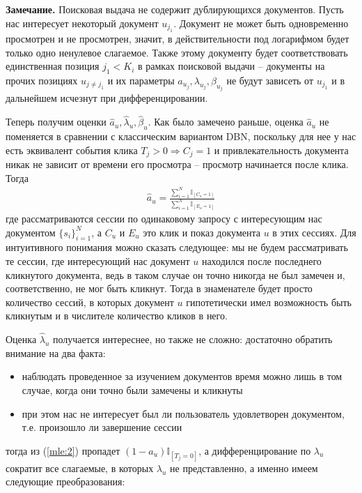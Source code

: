 \documentclass[diploma]{nanolab2015}
\begin{document}
  \textbf{Замечание.} Поисковая выдача не содержит дублирующихся документов. Пусть нас интересует некоторый документ $u_{j_1}$. Документ не может быть одновременно просмотрен и не просмотрен, значит, в действительности под логарифмом будет только одно ненулевое слагаемое. Также этому документу будет соответствовать единственная позиция $j_1 < K_i$ в рамках поисковой выдачи -- документы на прочих позициях $u_{j \neq j_1}$ и их параметры $a_{u_j}, \lambda_{u_j}, \beta_{u_j}$ не будут зависеть от $u_{j_1}$ и в дальнейшем исчезнут при дифференцировании.

  Теперь получим оценки $\hat{a}_u, \hat{\lambda}_u, \hat{\beta}_u$. Как было замечено раньше, оценка $\hat{a}_u$ не поменяется в сравнении с классическим вариантом DBN, поскольку для нее у нас есть эквивалент события клика $T_j > 0 \Rightarrow C_j = 1$ и привлекательность документа никак не зависит от времени его просмотра -- просмотр начинается после клика. Тогда
  \begin{align}
    \hat{a}_u = \frac{\sum\limits_{i=1}^{N}\mathbb{I}_{[C_u = 1]}}{\sum\limits_{i=1}^{N}\mathbb{I}_{[E_u = 1]}}
  \end{align}
  где рассматриваются сессии по одинаковому запросу с интересующим нас документом $\{s_i\}_{i=1}^{N}$, а $C_u$ и $E_u$ это клик и показ документа $u$ в этих сессиях. Для интуитивного понимания можно сказать следующее: мы не будем рассматривать те сессии, где интересующий нас документ $u$ находился после последнего кликнутого документа, ведь в таком случае он точно никогда не был замечен и, соответственно, не мог быть кликнут. Тогда в знаменателе будет просто количество сессий, в которых документ $u$ гипотетически имел возможность быть кликнутым и в числителе количество кликов в него.

  Оценка $\hat{\lambda}_u$ получается интереснее, но также не сложно: достаточно обратить внимание на два факта:
  \begin{itemize}
    \item наблюдать проведенное за изучением документов время можно лишь в том случае, когда они точно были замечены и кликнуты
    \item при этом нас не интересует был ли пользователь удовлетворен документом, т.е. произошло ли завершение сессии
  \end{itemize}

  тогда из (\ref{mle:2}) пропадет $(1-a_u)\mathbb{I}_{[T_j=0]}$, а дифференцирование по $\lambda_u$ сократит все слагаемые, в которых $\lambda_u$ не представленно, а именно имеем следующие преобразования:
\end{document}

